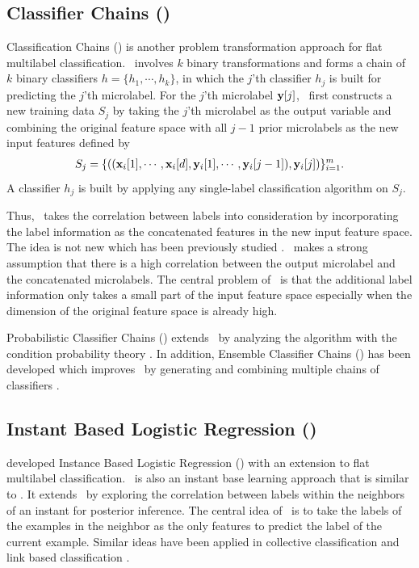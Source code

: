 {\subsection{Classifier Chains (\cc)}

Classification Chains (\cc) \citep{Read09classifier,Read11classifier} is another problem transformation approach for flat multilabel classification.
\cc\ involves $k$ binary transformations and forms a chain of $k$ binary classifiers $h=\{h_1,\cdots,h_k\}$, in which the $j$'th classifier $h_j$ is built for predicting the $j$'th microlabel.
For the $j$'th microlabel $\mathbf {y}[j]$, \cc\ first constructs a new training data $S_j$ by taking the $j$'th microlabel as the output variable and combining the original feature space with all $j-1$ prior microlabels as the new input features defined by
\begin{align*}
	S_j = \{((\mathbf {x}_i[1],\cdots,\mathbf {x}_i[d],\mathbf {y}_i[1],\cdots,\mathbf {y}_i[j-1]),\mathbf {y}_i[j])\}_{i=1}^{m}.
\end{align*}
A classifier $h_j$ is built by applying any single-label classification algorithm on $S_j$.

Thus, \cc\ takes the correlation between labels into consideration by incorporating the label information as the concatenated features in the new input feature space.
The idea is not new which has been previously studied \citep{Godbole04discriminative}.
\cc\ makes a strong assumption that there is a high correlation between the output microlabel and the concatenated microlabels.
The central problem of \cc\ is that the additional label information only takes a small part of the input feature space especially when the dimension of the original feature space is already high.

Probabilistic Classifier Chains (\pcc) extends \cc\ by analyzing the algorithm with the condition probability theory \citep{Read09classifier,Dembczynski10bayes}.
In addition, Ensemble Classifier Chains (\ecc) has been developed which improves \cc\ by generating and combining multiple chains of classifiers \citep{Read11classifier}. 



%
%
\subsection{Instant Based Logistic Regression (\iblr)} \label{sc_iblr}

\citet{Cheng09combining} developed Instance Based Logistic Regression (\iblr) with an extension to flat multilabel classification.
\iblr\ is also an instant base learning approach \citep{Aha91instance} that is similar to \mlknn.
It extends \mlknn\ by exploring the correlation between labels within the neighbors of an instant for posterior inference.
The central idea of \iblr\ is to take the labels of the examples in the neighbor as the only features to predict the label of the current example.
Similar ideas have been applied in collective classification \citep{Ghamrawi05collective} and link based classification \citep{Getoor05link, Getoor07introduction}.

}
